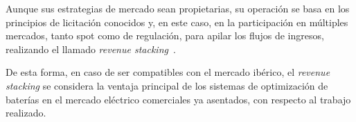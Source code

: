 Aunque sus estrategias de mercado sean propietarias, su operación se basa en los principios de licitación conocidos y, en este caso, en la participación en múltiples mercados, tanto spot como de regulación, para apilar los flujos de ingresos, realizando el llamado \textit{revenue stacking}~\cite{rancilio2022revenue}.

De esta forma, en caso de ser compatibles con el mercado ibérico, el \textit{revenue stacking} se considera la ventaja principal de los sistemas de optimización de baterías en el mercado eléctrico comerciales ya asentados, con respecto al trabajo realizado.
